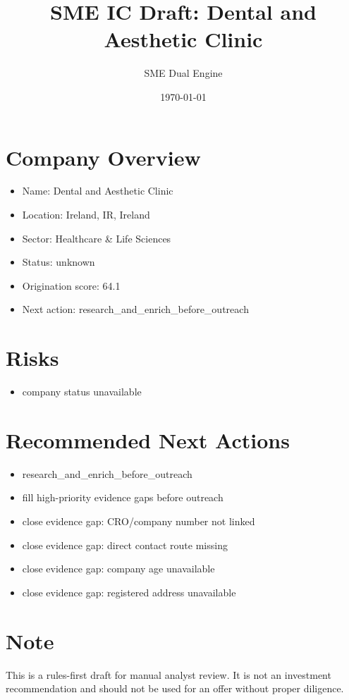 \documentclass[11pt,a4paper]{article}
\title{SME IC Draft: Dental and Aesthetic Clinic}
\author{SME Dual Engine}
\date{\today}
\begin{document}
\maketitle
\section*{Company Overview}
\begin{itemize}[leftmargin=1.4em]
\item Name: Dental and Aesthetic Clinic
\item Location: Ireland, IR, Ireland
\item Sector: Healthcare \& Life Sciences
\item Status: unknown
\item Origination score: 64.1
\item Next action: research\_and\_enrich\_before\_outreach
\end{itemize}
\section*{Risks}
\begin{itemize}[leftmargin=1.4em]
\item company status unavailable
\end{itemize}
\section*{Recommended Next Actions}
\begin{itemize}[leftmargin=1.4em]
\item research\_and\_enrich\_before\_outreach
\item fill high-priority evidence gaps before outreach
\item close evidence gap: CRO/company number not linked
\item close evidence gap: direct contact route missing
\item close evidence gap: company age unavailable
\item close evidence gap: registered address unavailable
\end{itemize}
\section*{Note}
This is a rules-first draft for manual analyst review. It is not an investment
recommendation and should not be used for an offer without proper diligence.
\end{document}
